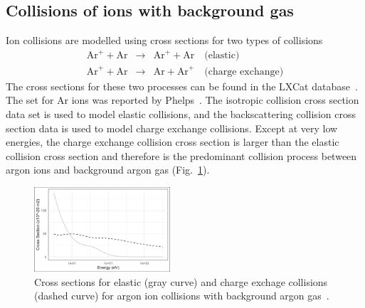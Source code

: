 \subsection{\label{IonCollision}Collisions of ions with background gas}
Ion collisions are modelled using cross sections for two types of collisions
\begin{eqnarray}
\text{Ar}^+ + \text{Ar} &\rightarrow& \text{Ar}^+ + \text{Ar} \quad \text{(elastic)} \\
\text{Ar}^+ + \text{Ar} &\rightarrow& \text{Ar} + \text{Ar}^+ \quad \text{(charge exchange)} 
\end{eqnarray}
The cross sections for these two processes can be found in the LXCat database~\cite{LXCat}. The set for Ar ions was reported by Phelps~\cite{Phelps1994}. The isotropic collision cross section data set is used to model elastic collisions, and the backscattering collision cross section data is used to model charge exchange collisions. Except at very low energies, the charge exchange collision cross section is larger than the elastic collision cross section and therefore is the predominant collision process between argon ions and background argon gas (Fig.~\ref{fig:CrossSectionsArgon}). 

\begin{figure}[htbp]
\centering
\includegraphics[width=0.45\textwidth]{Figures/CrossSections.jpg}
\caption{Cross sections for elastic (gray curve) and charge exchage collisions (dashed curve) for argon ion collisions with background argon gas~\cite{Phelps1994,LXCat}.}
\label{fig:CrossSectionsArgon}
\end{figure}

